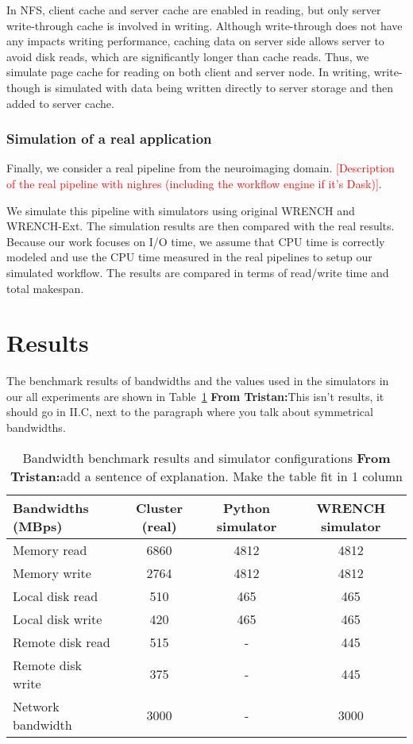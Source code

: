 \documentclass[conference]{IEEEtran}
\newcommand{\tristan}[1]{\color{orange}\textbf{From Tristan:}#1\color{black}}
\begin{document}
		    In NFS, client cache and server cache are enabled in reading, but only 
		    server write-through cache is involved in writing. 
		    Although write-through does not have any impacts writing performance, 
		    caching data on server side allows server to avoid disk reads, which are 
		    significantly longer than cache reads.
		    Thus, we simulate page cache for reading on both client and server node.
		    In writing, write-though is simulated with data being written directly to 
		    server storage and then added to server cache. 
		    
		    \subsubsection{Simulation of a real application}

		    Finally, we consider a real pipeline from the neuroimaging domain. 			
			\textcolor{red}{[Description of the real pipeline with nighres 
			(including the workflow engine if it's Dask)]}.  			
			
			We simulate this pipeline with simulators using original WRENCH and 
			WRENCH-Ext. 
			The simulation results are then compared with the real results. 
			Because our work focuses on I/O time, we assume that CPU time is 
			correctly modeled and use the CPU time measured in the real pipelines 
			to setup our simulated workflow. The results are compared in terms of 
			read/write time and total makespan.

	\section{Results}
	\label{results}			
		The benchmark results of bandwidths and the values used in the simulators 
		in our all experiments are shown in Table~\ref{table:benchmark} \tristan{This isn't results, it should go in II.C, 
		next to the paragraph where you talk about symmetrical bandwidths}. 
		
		\begin{table}
		\centering
		\begin{tabular}{|l|c|c|c|}
		\hline
			Bandwidths (MBps)  & Cluster (real) & Python simulator & WRENCH simulator\\
		\hline
			Memory read  & 6860	& 4812	 & 4812\\
			Memory write & 2764	& 4812 & 4812\\
			Local disk read & 510 & 465 & 465\\
			Local disk write & 420 & 465	 & 465\\
			Remote disk read & 515 & - & 445\\
			Remote disk write & 375 & - & 445\\
			Network bandwidth & 3000 & - & 3000\\
		\hline
		\end{tabular}
		\caption{Bandwidth benchmark results and simulator configurations \tristan{add a sentence of explanation. Make the table fit in 1 column}}
		\label{table:benchmark}
		\end{table}		
		
\end{document}
